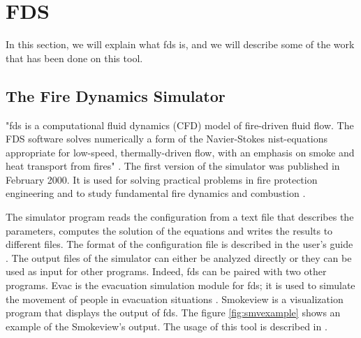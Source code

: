 
\section{FDS}
\label{sec:fds}

In this section, we will explain what \gls{fds} is, and we will describe some of
the work that has been done on this tool.

\subsection{The Fire Dynamics Simulator}
\label{sec:fdsdesc}

"\gls{fds} is a computational fluid dynamics (CFD) model of fire-driven fluid
flow. The FDS software solves numerically a form of the Navier-Stokes
nist-equations appropriate for low-speed, thermally-driven flow, with an
emphasis on smoke and heat transport from fires" \cite{fds:pres}. The first
version of the simulator was published in February 2000. It is used for solving
practical problems in fire protection engineering and to study fundamental
fire dynamics and combustion \cite{fds:tutorial}.

The simulator program reads the configuration from a text file that describes
the parameters, computes the solution of the equations and writes the results to
different files. The format of the configuration file is described in the user's
guide \cite{fdsguide}. The output files of the simulator can either be analyzed
directly or they can be used as input for other programs. Indeed, \gls{fds} can
be paired with two other programs. Evac is the evacuation simulation module for
\gls{fds}; it is used to simulate the movement of people in evacuation
situations \cite{fds:evac}. Smokeview is a visualization program that displays
the output of \gls{fds}. The figure \ref{fig:smvexample} shows an example of the
Smokeview's output. The usage of this tool is described in \cite{smvguide}.

